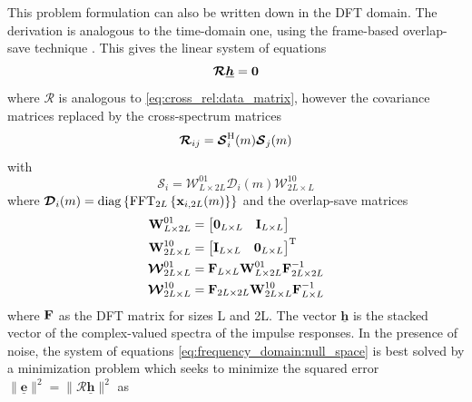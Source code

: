 \documentclass{article}
\newcommand{\x}{\mtxb{x}}
\newcommand{\hf}{\underline{\bm{h}}}
\newcommand{\Rf}{\bm{\mathcal{R}}}
\begin{document}
This problem formulation can also be written down in the DFT domain. The derivation is analogous to the time-domain one, using the frame-based overlap-save technique \cite{}.
This gives the linear system of equations 
\begin{equation}
    \Rf \hf = \bm{0} \label{eq:frequency_domain:null_space}\\
\end{equation}
where \(\Rf\) is analogous to \eqref{eq:cross_rel:data_matrix}, however the covariance matrices replaced by the cross-spectrum matrices 
\begin{equation}
    \Rf_{ij} = \bm{\mathcal{S}}_{i}^\herm (m) \bm{\mathcal{S}}_{j}(m)
\end{equation}
with 
\begin{equation}
    \bm{\mathcal{S}}_{i} = \bm{\mathcal{W}}^{01}_{L \times 2L} \bm{\mathcal{D}}_{i}(m) \bm{\mathcal{W}}^{10}_{2L \times L}
\end{equation}
where \(\bm{\mathcal{D}}_{i}(m) = \operatorname{diag} \left\{ \operatorname{FFT}_{2L} \left\{ \x_{i,2L}(m) \right\} \right\}\) and the overlap-save matrices
\begin{align}
    \bm{\mathrm{W}}_{L \times 2L}^{01} &= \begin{bmatrix}
        \bm{\mathrm{0}}_{L \times L} & \bm{\mathrm{I}}_{L \times L}
    \end{bmatrix}\\
    \bm{\mathrm{W}}_{2L \times L}^{10} &= \begin{bmatrix}
        \bm{\mathrm{I}}_{L \times L} & \bm{\mathrm{0}}_{L \times L}
    \end{bmatrix}^{\mathrm{T}}\\
    \bm{\mathcal{W}}_{2L \times L}^{01} &= \bm{\mathrm{F}}_{L \times L} \bm{\mathrm{W}}_{L \times 2L}^{01} \bm{\mathrm{F}}_{2L \times 2L}^{-1}\\
    \bm{\mathcal{W}}_{2L \times L}^{10} &= \bm{\mathrm{F}}_{2L \times 2L} \bm{\mathrm{W}}_{2L \times L}^{10} \bm{\mathrm{F}}_{L \times L}^{-1}
\end{align} where $\bm{\mathrm{F}}$ as the DFT matrix for sizes L and 2L.
The vector \(\hf\) is the stacked vector of the complex-valued spectra of the impulse responses.
In the presence of noise, the system of equations \eqref{eq:frequency_domain:null_space} is best solved by a minimization problem which seeks to minimize the squared error \(\|\underline{\bm{e}} \|^2 = \| \Rf \hf \|^2\) as
\end{document}
